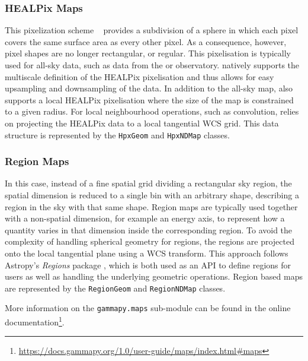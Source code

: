 \documentclass[longauth]{aa}
\newcommand{\code}[1]{\texttt{#1}}
\begin{document}
\subsubsection{HEALPix Maps}
This pixelization scheme ~\citep{Calabretta2002, Gorski2005} provides a
subdivision of a sphere in which each pixel covers the same surface area as
every other pixel. As a consequence, however, pixel shapes are no longer
rectangular, or regular.
This pixelisation is typically used for all-sky data, such as data
from the \hawc or \fermi observatory. \gammapy natively supports
the multiscale definition of the HEALPix pixelisation and thus
allows for easy upsampling and downsampling of the data. In addition to
the all-sky map, \gammapy also supports a local HEALPix
pixelisation where the size of the map is constrained to a given
radius.
For local neighbourhood operations, such as convolution, \gammapy relies
on projecting the HEALPix data to a local tangential WCS grid.
This data structure is represented by the \code{HpxGeom} and \code{HpxNDMap}
classes. 


\subsubsection{Region Maps}
In this case, instead of a fine spatial grid
dividing a rectangular sky region, the spatial dimension is reduced to a single
bin with an arbitrary shape, describing a region in the sky with that same
shape. Region maps are typically used together with a non-spatial dimension, for
example an energy axis, to represent how a quantity varies in that dimension
inside the corresponding region. To avoid the complexity of handling
spherical geometry for regions, the regions are projected onto the local
tangential plane using a WCS transform. This approach follows Astropy's \textit{Regions}
package \citep{AstropyRegions2022}, which is both used as an API to define regions
for users as well as handling the underlying geometric operations. Region based
maps are represented by the \code{RegionGeom} and \code{RegionNDMap} classes.

More information on the \code{gammapy.maps} sub-module can be found 
in the online documentation\footnote{\url{https://docs.gammapy.org/1.0/user-guide/maps/index.html\#maps}}.
\end{document}
